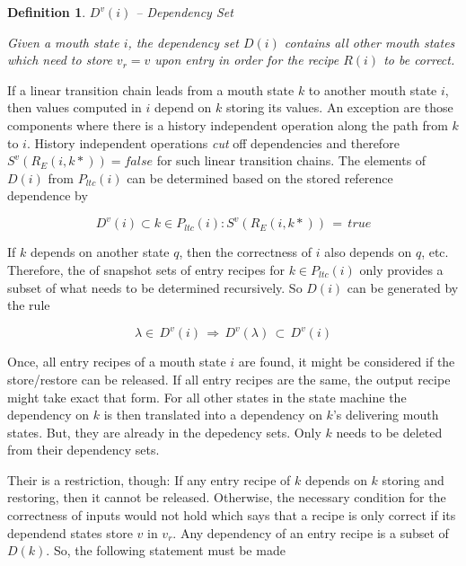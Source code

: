\documentclass[12pt,a4paper]{scrartcl}
\newtheorem{definition}{Definition}
\begin{document}
\begin{definition} $D^v(i)$ -- Dependency Set

    Given a mouth state $i$, the dependency set $D(i)$ contains all other
    mouth states which need to store $v_r=v$ upon entry in order for the 
    recipe $R(i)$ to be correct.
    
\end{definition}

If a linear transition chain leads from a mouth state $k$ to another mouth
state $i$, then values computed in $i$ depend on $k$ storing its values. An
exception are those components where there is a history independent operation
along the path from $k$ to $i$. History independent operations \textit{cut} off
dependencies and therefore $S^v(R_E(i,k*))=false$ for such linear
transition chains. The elements of $D(i)$ from $P_{ltc}(i)$ can be determined
based on the stored reference dependence by

\begin{equation}
    D^v(i) \subset {k\in P_{ltc}(i): S^v(R_E(i,k*))\,=\,true }
\end{equation}

If $k$ depends on another state $q$, then the correctness of $i$ also depends
on $q$, etc. Therefore, the of snapshot sets of entry recipes for $k\in
P_{ltc}(i)$ only provides a subset of what needs to be determined
recursively. So $D(i)$ can be generated by the rule

\begin{equation}

    \lambda\in\,D^v(i)\,\Rightarrow\,D^v(\lambda)\,\subset\,D^v(i)
    
\end{equation}

Once, all entry recipes of a mouth state $i$ are found, it might be considered
if the store/restore can be released. If all entry recipes are the same, the
output recipe might take exact that form. For all other states in the state
machine the dependency on $k$ is then translated into a dependency on $k$'s
delivering mouth states. But, they are already in the depedency sets. Only $k$
needs to be deleted from their dependency sets. 

Their is a restriction, though: If any entry recipe of $k$ depends on $k$
storing and restoring, then it cannot be released.  Otherwise, the necessary
condition for the correctness of inputs would not hold which says that a recipe
is only correct if its dependend states store $v$ in $v_r$.  Any dependency of
an entry recipe is a subset of $D(k)$. So, the following statement must be 
made
\end{document}
